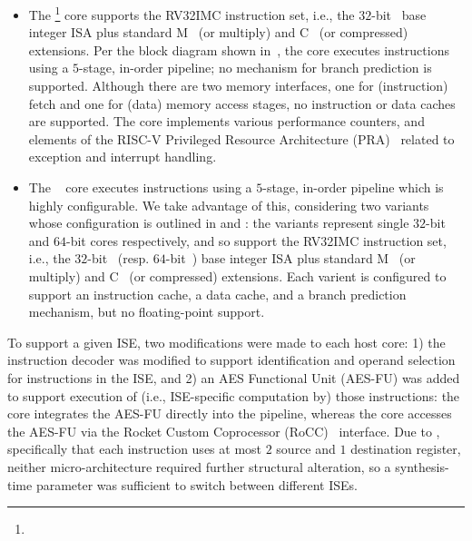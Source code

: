 \begin{itemize}
\item The \footnote{%
      } core 
      supports the 
      RV32IMC 
      instruction set, i.e.,
      the 
             $32$-bit~\cite[Section 2]{RV:ISA:I:19} 
      base integer ISA plus 
      standard M~\cite[Section  7]{RV:ISA:I:19}
               (or   multiply)
               and
               C~\cite[Section 16]{RV:ISA:I:19}
               (or compressed)
               extensions.
      Per the block diagram shown in~,
      the core 
      executes instructions using a $5$-stage, in-order pipeline;
      no mechanism for
      branch prediction
      is supported.
      Although there are two memory interfaces, one for (instruction) fetch and one for (data) memory access stages,
      no
      instruction or data caches 
      are supported.
      The core implements various performance counters,
      and
      elements of the
      RISC-V Privileged Resource Architecture (PRA)~\cite[Chapter 3]{RV:ISA:II:17}
      related to exception and interrupt handling.

\item The ~\cite{rocket:16} 
        core
      executes instructions using a $5$-stage, in-order pipeline
      which is highly configurable.
      We take advantage of this, considering two variants whose configuration
      is outlined in
      and 
      :
      the variants represent single $32$-bit and $64$-bit cores respectively,
      and so
      support  the 
      RV32IMC 
      instruction set, i.e.,
      the 
             $32$-bit~\cite[Section 2]{RV:ISA:I:19} 
      (resp. $64$-bit~\cite[Section 5]{RV:ISA:I:19})
      base integer ISA plus 
      standard M~\cite[Section  7]{RV:ISA:I:19}
               (or   multiply)
               and
               C~\cite[Section 16]{RV:ISA:I:19}
               (or compressed)
               extensions.
      Each varient is configured to support
      an instruction cache, 
      a  data        cache,
      and
      a  branch prediction mechanism,
      but 
      no floating-point support.

\end{itemize}

\noindent
To support a given ISE, two modifications were made to each host core:
1) the instruction decoder was modified to support identification and 
   operand selection for instructions in the ISE,
   and
2) an AES Functional Unit (AES-FU) was added to support execution of
   (i.e., ISE-specific computation by) those instructions:
   the  core integrates the AES-FU directly into the pipeline,
   whereas
   the  core accesses   the AES-FU via the
   Rocket Custom Coprocessor (RoCC)~\cite[Section 4]{rocket:16}
   interface.
Due to , 
specifically that each instruction uses at most $2$ source and $1$ destination register, 
neither micro-architecture required further structural alteration, so
a synthesis-time parameter was sufficient to switch between different 
ISEs.

